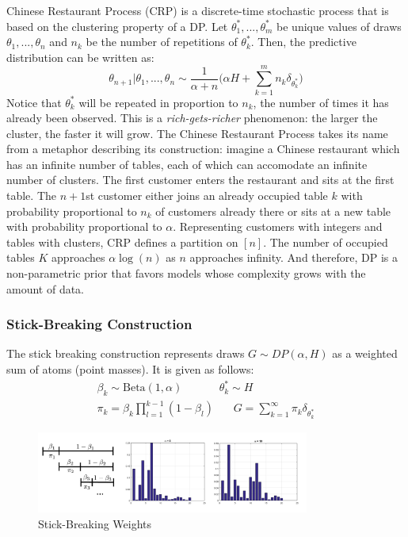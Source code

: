 Chinese Restaurant Process (CRP) is a discrete-time stochastic process that is based on the clustering property of a DP. Let $\theta_{1}^{\ast},...,\theta_{m}^{\ast}$ be unique values of draws $\theta_1,...,\theta_n$ and $n_k$ be the number of repetitions of $\theta_{k}^{\ast}$. Then, the predictive distribution can be written as:
\begin{equation}
    \theta_{n+1}|\theta_1,...,\theta_n \sim \frac{1}{\alpha+n}\bigg(\alpha H + \sum_{k=1}^{m}n_k \delta_{\theta_{k}^{\ast}}\bigg)
\end{equation}
Notice that $\theta_{k}^{\ast}$ will be repeated in proportion to $n_k$, the number of times it has already been observed. This is a \textit{rich-gets-richer} phenomenon: the larger the cluster, the faster it will grow.
The Chinese Restaurant Process takes its name from a metaphor describing its construction: imagine a Chinese restaurant which has an infinite number of tables, each of which can accomodate an infinite number of clusters. The first customer enters the restaurant and sits at the first table. The $n+1$st customer either joins an already occupied table $k$ with probability proportional to $n_k$ of customers already there or sits at a new table with probability proportional to $\alpha$. Representing customers with integers and tables with clusters, CRP defines a partition on $[n]$. The number of occupied tables $K$ approaches $\alpha \log(n)$ as $n$ approaches infinity. And therefore, DP is a non-parametric prior that favors models whose complexity grows with the amount of data.   

\subsubsection{Stick-Breaking Construction}

The stick breaking construction \cite{sethuraman94} represents draws $G\sim DP(\alpha, H)$ as a weighted sum of atoms (point masses). It is given as follows:
\begin{eqnarray}
    \beta_k \sim \mathrm{Beta}(1,\alpha) ~~~ ~~~~ ~~~~ ~~~~ \theta_{k}^{\ast}\sim H\\
    \pi_k = \beta_k\prod_{l=1}^{k-1}(1-\beta_l) ~~~~ ~~~~ G = \sum_{k=1}^{\infty}\pi_k \delta_{\theta_{k}^{\ast}}
\end{eqnarray}

\begin{figure}[tbhp]
    \centering
    \includegraphics[width=0.8\textwidth, trim={10 10 10 10}]{figures/stick_breaks.png}
    \caption{Stick-Breaking Weights}
    \label{fig:sticks}
\end{figure}

